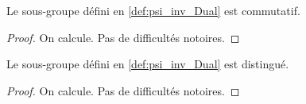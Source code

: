 \begin{proposition}
    \label{prop:psi_inv_Dual_comm}
    \leanok

    Le sous-groupe défini en \ref{def:psi_inv_Dual} est commutatif.
    \begin{proof}
        \leanok
        On calcule. Pas de difficultés notoires.
    \end{proof}
\end{proposition}

\begin{proposition}
    \label{prop:psi_inv_Dual_normal}
    \leanok

    Le sous-groupe défini en \ref{def:psi_inv_Dual} est distingué.
    \begin{proof}
        \leanok 
        On calcule. Pas de difficultés notoires.
    \end{proof}
\end{proposition}
